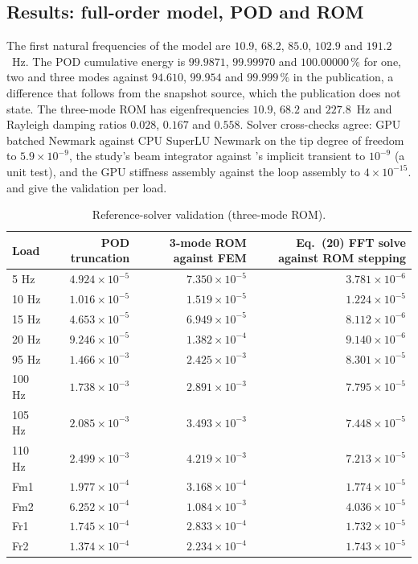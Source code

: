 \subsection*{Results: full-order model, POD and ROM}

The first natural frequencies of the model are $10.9$, $68.2$, $85.0$, $102.9$ and $191.2$~Hz. The POD cumulative energy is $99.9871$, $99.99970$ and $100.00000\,\%$ for one, two and three modes against $94.610$, $99.954$ and $99.999\,\%$ in the publication, a difference that follows from the snapshot source, which the publication does not state. The three-mode ROM has eigenfrequencies $10.9$, $68.2$ and $227.8$~Hz and Rayleigh damping ratios $0.028$, $0.167$ and $0.558$. Solver cross-checks agree: GPU batched Newmark against CPU SuperLU Newmark on the tip degree of freedom to $5.9\times10^{-9}$, the study's beam integrator against \fea{}'s implicit transient to $10^{-9}$ (a unit test), and the GPU stiffness assembly against the loop assembly to $4\times10^{-15}$.  and  give the validation per load.

\begin{table}[tbp]
\centering\footnotesize
\caption{Reference-solver validation (three-mode ROM).}\label{tab:vf-fr-ref}
\begin{tabular}{@{}lrrr@{}}
\toprule
Load & POD truncation & 3-mode ROM against FEM & Eq.~(20) FFT solve against ROM stepping\\
\midrule
5 Hz & $4.924\times10^{-5}$ & $7.350\times10^{-5}$ & $3.781\times10^{-6}$\\
10 Hz & $1.016\times10^{-5}$ & $1.519\times10^{-5}$ & $1.224\times10^{-5}$\\
15 Hz & $4.653\times10^{-5}$ & $6.949\times10^{-5}$ & $8.112\times10^{-6}$\\
20 Hz & $9.246\times10^{-5}$ & $1.382\times10^{-4}$ & $9.140\times10^{-6}$\\
95 Hz & $1.466\times10^{-3}$ & $2.425\times10^{-3}$ & $8.301\times10^{-5}$\\
100 Hz & $1.738\times10^{-3}$ & $2.891\times10^{-3}$ & $7.795\times10^{-5}$\\
105 Hz & $2.085\times10^{-3}$ & $3.493\times10^{-3}$ & $7.448\times10^{-5}$\\
110 Hz & $2.499\times10^{-3}$ & $4.219\times10^{-3}$ & $7.213\times10^{-5}$\\
Fm1 & $1.977\times10^{-4}$ & $3.168\times10^{-4}$ & $1.774\times10^{-5}$\\
Fm2 & $6.252\times10^{-4}$ & $1.084\times10^{-3}$ & $4.036\times10^{-5}$\\
Fr1 & $1.745\times10^{-4}$ & $2.833\times10^{-4}$ & $1.732\times10^{-5}$\\
Fr2 & $1.374\times10^{-4}$ & $2.234\times10^{-4}$ & $1.743\times10^{-5}$\\
\bottomrule
\end{tabular}
\end{table}

